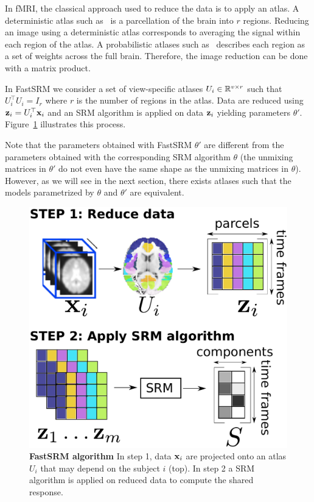\documentclass{article}
\begin{document}
In fMRI, the classical approach used to reduce the data is to apply an atlas.
%
A deterministic atlas such as~\cite{bellec2010multi} is a parcellation of the
brain into $r$ regions.
%
Reducing an image using a deterministic atlas corresponds to
averaging the signal within each region of the atlas.
%
A probabilistic atlases such
as~\cite{dadi_fine-grain_2020} describes each region as a set of weights across
the full brain.
%
Therefore, the image reduction can be done with a matrix product.
%


In FastSRM we consider a set of view-specific atlases $U_i \in \mathbb{R}^{v \times r}$ such that
$U_i^{\top}U_i = I_r$ where $r$ is the number of regions in the atlas.
%
Data are reduced using $\mathbf{z}_i = U_i^{\top} \mathbf{x}_i$ and an SRM algorithm is applied
on data $\mathbf{z}_i$ yielding parameters $\theta'$.
%
Figure~\ref{fig:srm:conceptual} illustrates this process.
%


Note that the parameters obtained with FastSRM $\theta'$ are different
from the parameters obtained with the corresponding SRM algorithm $\theta$ (the
unmixing matrices in $\theta'$ do not even have the same shape as the unmixing
matrices in $\theta$).
%
However, as we will see in the next section, there exists atlases such that the
models parametrized by $\theta$ and
$\theta'$ are equivalent.
%


\begin{figure}
  \centering
  \includegraphics[scale=0.34]{figures/srm/conceptual_figure2.pdf}
  \caption{\textbf{FastSRM algorithm} In step 1, data $\mathbf{x}_i$ are projected onto an
    atlas $U_i$ that may depend on the subject $i$ (top).
    In step 2 a SRM algorithm is applied on reduced data to compute the shared
    response.
  }
  \label{fig:srm:conceptual}
\end{figure}
\end{document}
